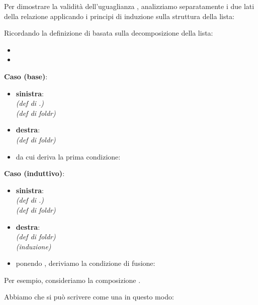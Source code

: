 \begin{proofframe}[title=Derivazione formale]
Per dimostrare la validità dell'uguaglianza , analizziamo separatamente i due lati della relazione applicando i principi di induzione sulla struttura della lista:

Ricordando la definizione di  basata sulla decomposizione della lista:
\begin{itemize}
    \item {}
    \item {} 
\end{itemize}

\textbf{Caso \code{[]} (base)}:
\begin{itemize}
    \item \textbf{sinistra}:  \\
         \textit{ (def di .)} \\
     \textit{(def di foldr)}
\item \textbf{destra}:    \\
           \textit{(def di foldr)}
    \item da cui deriva la prima condizione: 
\end{itemize}

\textbf{Caso  (induttivo)}:
\begin{itemize}
    \item \textbf{sinistra}:  \\
          \textit{ (def di .)}\\
         \textit{ (def di foldr)} 
    \item \textbf{destra}:  \\
         \textit{ (def di foldr)} \\
         \textit{ (induzione)}
      \item ponendo , deriviamo la condizione di fusione:
          \subitem{}
\end{itemize}
\end{proofframe}

Per esempio, consideriamo la composizione .

Abbiamo che  si può scrivere come una  in questo modo: \\

